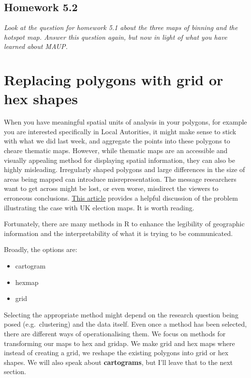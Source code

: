 \documentclass[]{book}
\providecommand{\tightlist}{%
  \setlength{\itemsep}{0pt}\setlength{\parskip}{0pt}}
\begin{document}
\hypertarget{homework-5.2}{%
\subsection{Homework 5.2}\label{homework-5.2}}

\emph{Look at the question for homework 5.1 about the three maps of binning and the hotspot map. Answer this question again, but now in light of what you have learned about MAUP. }

\hypertarget{replacing-polygons-with-grid-or-hex-shapes}{%
\section{Replacing polygons with grid or hex shapes}\label{replacing-polygons-with-grid-or-hex-shapes}}

When you have meaningful spatial units of analysis in your polygons, for example you are interested specifically in Local Autorities, it might make sense to stick with what we did last week, and aggregate the points into these polygons to cheare thematic maps. However, while thematic maps are an accessible and visually appealing method for displaying spatial information, they can also be highly misleading. Irregularly shaped polygons and large differences in the size of areas being mapped can introduce misrepresentation. The message researchers want to get across might be lost, or even worse, misdirect the viewers to erroneous conclusions. \href{https://www.tandfonline.com/eprint/q9w7iUhFJwzvBR84GkT9/full}{This article} provides a helpful discussion of the problem illustrating the case with UK election maps. It is worth reading.

Fortunately, there are many methods in R to enhance the legibility of geographic information and the interpretability of what it is trying to be communicated.

Broadly, the options are:

\begin{itemize}
\tightlist
\item
  cartogram
\item
  hexmap
\item
  grid
\end{itemize}

Selecting the appropriate method might depend on the research question being posed (e.g.~clustering) and the data itself. Even once a method has been selected, there are different ways of operationalising them. We focus on methods for transforming our maps to hex and gridap. We make grid and hex maps where instead of creating a grid, we reshape the existing polygons into grid or hex shapes. We will also speak about \textbf{cartograms}, but I'll leave that to the next section.
\end{document}
